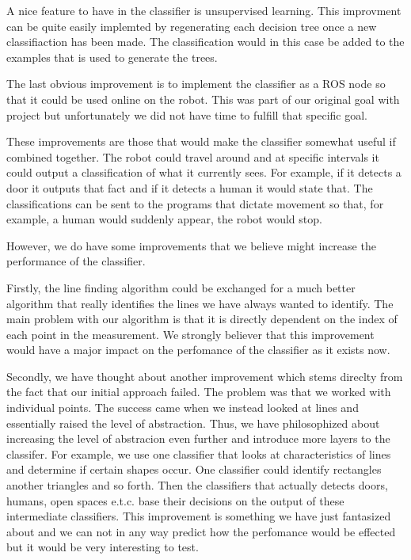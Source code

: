 \documentclass[a4paper, 10pt, conference]{ieeeconf}      %
\begin{document}
A nice feature to have in the classifier is unsupervised learning. This improvment can be quite easily implemted by regenerating each decision tree once a new classifiaction has been made. The classification would in this case be added to the examples that is used to generate the trees.

The last obvious improvement is to implement the classifier as a ROS node so that it could be used online on the robot. This was part of our original goal with project but unfortunately we did not have time to fulfill that specific goal.

These improvements are those that would make the classifier somewhat useful if combined together. The robot could travel around and at specific intervals it could output a classification of what it currently sees. For example, if it detects a door it outputs that fact and if it detects a human it would state that. The classifications can be sent to the programs that dictate movement so that, for example, a human would suddenly appear, the robot would stop.

However, we do have some improvements that we believe might increase the performance of the classifier.

Firstly, the line finding algorithm could be exchanged for a much better algorithm that really identifies the lines we have always wanted to identify. The main problem with our algorithm is that it is directly dependent on the index of each point in the measurement. We strongly believer that this improvement would have a major impact on the perfomance of the classifier as it exists now.

Secondly, we have thought about another improvement which stems direclty from the fact that our initial approach failed. The problem was that we worked with individual points. The success came when we instead looked at lines and essentially raised the level of abstraction. Thus, we have philosophized about increasing the level of abstracion even further and introduce more layers to the classifer. For example, we use one classifier that looks at characteristics of lines and determine if certain shapes occur. One classifier could identify rectangles another triangles and so forth. Then the classifiers that actually detects doors, humans, open spaces e.t.c. base their decisions  on the output of these intermediate classifiers. This improvement is something we have just fantasized about and we can not in any way predict how the perfomance would be effected but it would be very interesting to test.
\end{document}

